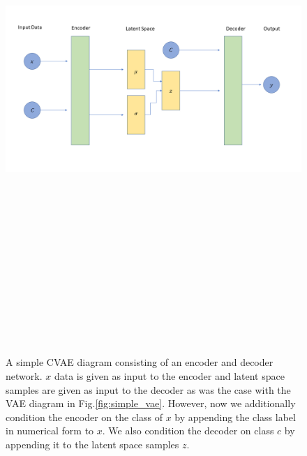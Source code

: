 \begin{figure}
    \centering
    \includegraphics[width=16cm,height=20cm,keepaspectratio]{figures/simple_cvae_diagram.png}
    \caption[Simple conditional variational autoencoder illustration.]{A simple \ac{CVAE} diagram consisting of an encoder and decoder network. $x$ data is given as input to the encoder and latent space samples are given as input to the decoder as was the case with the \ac{VAE} diagram in Fig.\ref{fig:simple_vae}. However, now we additionally condition the encoder on the class of $x$ by appending the class label in numerical form to $x$. We also condition the decoder on class $c$ by appending it to the latent space samples $z$.}
    \label{fig:simple_cvae}
\end{figure}

